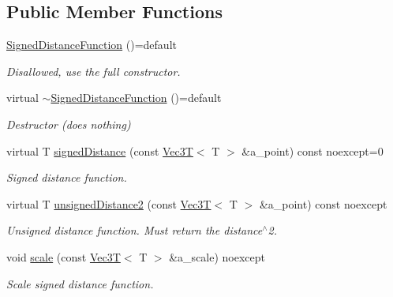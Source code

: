 \subsection*{Public Member Functions}
\begin{DoxyCompactItemize}
\item 
\mbox{\label{classSignedDistanceFunction_abfeeff9b3901e03ec6b73317dc9a722e}} 
\hyperlink{classSignedDistanceFunction_abfeeff9b3901e03ec6b73317dc9a722e}{Signed\+Distance\+Function} ()=default
\begin{DoxyCompactList}\small\item\em Disallowed, use the full constructor. \end{DoxyCompactList}\item 
\mbox{\label{classSignedDistanceFunction_ab47b289bd8351d7f323938c91b2bb92b}} 
virtual \hyperlink{classSignedDistanceFunction_ab47b289bd8351d7f323938c91b2bb92b}{$\sim$\+Signed\+Distance\+Function} ()=default
\begin{DoxyCompactList}\small\item\em Destructor (does nothing) \end{DoxyCompactList}\item 
virtual T \hyperlink{classSignedDistanceFunction_af5912280ca51dc21a2d6949a30ec7d21}{signed\+Distance} (const \hyperlink{classVec3T}{Vec3T}$<$ T $>$ \&a\+\_\+point) const noexcept=0
\begin{DoxyCompactList}\small\item\em Signed distance function. \end{DoxyCompactList}\item 
virtual T \hyperlink{classSignedDistanceFunction_a2a3e72186725a4e931db0f8d4895bcb8}{unsigned\+Distance2} (const \hyperlink{classVec3T}{Vec3T}$<$ T $>$ \&a\+\_\+point) const noexcept
\begin{DoxyCompactList}\small\item\em Unsigned distance function. Must return the distance$^\wedge$2. \end{DoxyCompactList}\item 
void \hyperlink{classSignedDistanceFunction_a7855565ecca2d35de173161ecfbf19ae}{scale} (const \hyperlink{classVec3T}{Vec3T}$<$ T $>$ \&a\+\_\+scale) noexcept
\begin{DoxyCompactList}\small\item\em Scale signed distance function. \end{DoxyCompactList}\item 

\end{DoxyCompactItemize}
